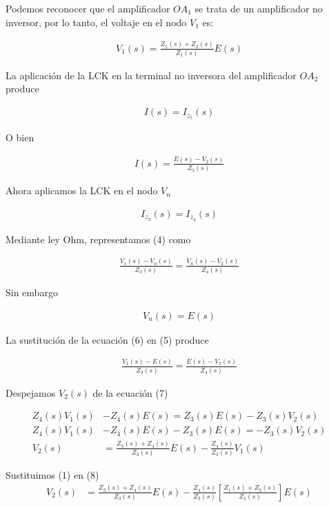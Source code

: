 \documentclass{article}
\begin{document}
Podemos reconocer que el amplificador $OA_1$ se trata de un amplificador no inversor, por lo tanto, el voltaje en el nodo $V_1$ es:

\begin{align}
	V_1(s) = \frac{Z_1(s) + Z_2(s)}{Z_1(s)}E(s)
\end{align}

La aplicación de la LCK en la terminal no inversora del amplificador $OA_2$ produce

\begin{align}
	I(s) = I_{z_5}(s)
\end{align}

O bien

\begin{align}
	I(s) = \frac{E(s) - V_2(s)}{Z_5(s)}
\end{align}

Ahora aplicamos la LCK en el nodo $V_n$

\begin{align}
	I_{z_3}(s) = I_{z_4}(s)
\end{align}

Mediante ley Ohm, representamos (4) como

\begin{align}
	\frac{V_1(s) - V_n(s)}{Z_3(s)} = \frac{V_n(s) - V_2(s)}{Z_4(s)}
\end{align}

Sin embargo

\begin{align}
	V_n(s) = E(s)
\end{align}

La sustitución de la ecuación (6) en (5) produce

\begin{align}
	\frac{V_1(s) - E(s)}{Z_3(s)} = \frac{E(s) - V_2(s)}{Z_4(s)}
\end{align} 

Despejamos $V_2(s)$ de la ecuación (7)

\begin{align}
	Z_4(s)V_1(s) &- Z_4(s)E(s) = Z_3(s)E(s) - Z_3(s)V_2(s) \nonumber \\
	Z_4(s)V_1(s) &- Z_4(s)E(s) - Z_3(s)E(s) = - Z_3(s)V_2(s) \nonumber \\
	V_2(s) &= \frac{Z_3(s) + Z_4(s)}{Z_3(s)}E(s) - \frac{Z_4(s)}{Z_3(s)}V_1(s)
\end{align} 

Sustituimos (1) en (8)
\begin{align}
	V_2(s) &= \frac{Z_3(s) + Z_4(s)}{Z_3(s)}E(s) - \frac{Z_4(s)}{Z_3(s)} \left[ \frac{Z_1(s) + Z_2(s)}{Z_1(s)} \right] E(s)
\end{align}
\end{document}

